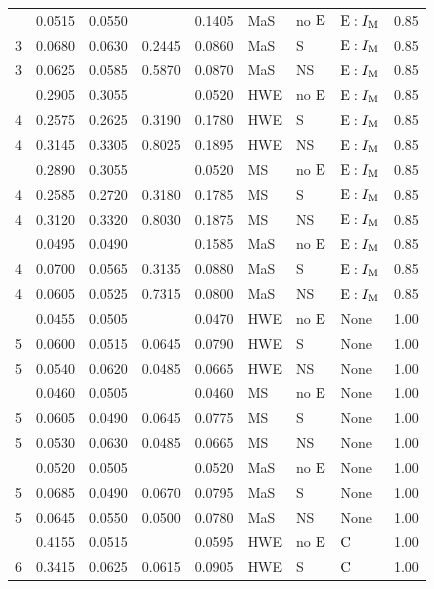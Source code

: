 \begin{longtable}[t]{lllllllll}
\addlinespace
3 & 0.0515 & 0.0550 &  & 0.1405 & MaS & no ${\rm E}$ & ${\rm E}:I_{{\rm M}}$ & 0.85\\
3 & 0.0680 & 0.0630 & 0.2445 & 0.0860 & MaS & S & ${\rm E}:I_{{\rm M}}$ & 0.85\\
3 & 0.0625 & 0.0585 & 0.5870 & 0.0870 & MaS & NS & ${\rm E}:I_{{\rm M}}$ & 0.85\\
\addlinespace
4 & 0.2905 & 0.3055 &  & 0.0520 & HWE & no ${\rm E}$ & ${\rm E}:I_{{\rm M}}$ & 0.85\\
4 & 0.2575 & 0.2625 & 0.3190 & 0.1780 & HWE & S & ${\rm E}:I_{{\rm M}}$ & 0.85\\
4 & 0.3145 & 0.3305 & 0.8025 & 0.1895 & HWE & NS & ${\rm E}:I_{{\rm M}}$ & 0.85\\
\addlinespace
4 & 0.2890 & 0.3055 &  & 0.0520 & MS & no ${\rm E}$ & ${\rm E}:I_{{\rm M}}$ & 0.85\\
4 & 0.2585 & 0.2720 & 0.3180 & 0.1785 & MS & S & ${\rm E}:I_{{\rm M}}$ & 0.85\\
4 & 0.3120 & 0.3320 & 0.8030 & 0.1875 & MS & NS & ${\rm E}:I_{{\rm M}}$ & 0.85\\
\addlinespace
4 & 0.0495 & 0.0490 &  & 0.1585 & MaS & no ${\rm E}$ & ${\rm E}:I_{{\rm M}}$ & 0.85\\
4 & 0.0700 & 0.0565 & 0.3135 & 0.0880 & MaS & S & ${\rm E}:I_{{\rm M}}$ & 0.85\\
4 & 0.0605 & 0.0525 & 0.7315 & 0.0800 & MaS & NS & ${\rm E}:I_{{\rm M}}$ & 0.85\\
\addlinespace
5 & 0.0455 & 0.0505 &  & 0.0470 & HWE & no ${\rm E}$ & None & 1.00\\
5 & 0.0600 & 0.0515 & 0.0645 & 0.0790 & HWE & S & None & 1.00\\
5 & 0.0540 & 0.0620 & 0.0485 & 0.0665 & HWE & NS & None & 1.00\\
\addlinespace
5 & 0.0460 & 0.0505 &  & 0.0460 & MS & no ${\rm E}$ & None & 1.00\\
5 & 0.0605 & 0.0490 & 0.0645 & 0.0775 & MS & S & None & 1.00\\
5 & 0.0530 & 0.0630 & 0.0485 & 0.0665 & MS & NS & None & 1.00\\
\addlinespace
5 & 0.0520 & 0.0505 &  & 0.0520 & MaS & no ${\rm E}$ & None & 1.00\\
5 & 0.0685 & 0.0490 & 0.0670 & 0.0795 & MaS & S & None & 1.00\\
5 & 0.0645 & 0.0550 & 0.0500 & 0.0780 & MaS & NS & None & 1.00\\
\addlinespace
6 & 0.4155 & 0.0515 &  & 0.0595 & HWE & no ${\rm E}$ & ${\rm C}$ & 1.00\\
6 & 0.3415 & 0.0625 & 0.0615 & 0.0905 & HWE & S & ${\rm C}$ & 1.00\\

\end{longtable}
